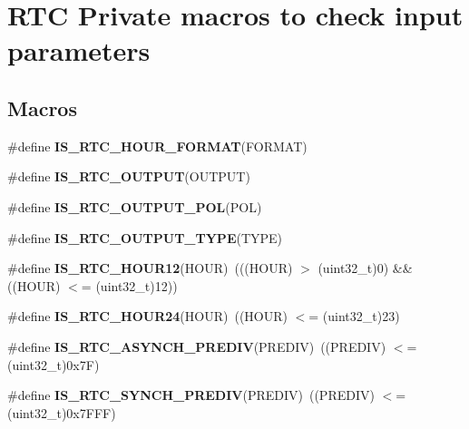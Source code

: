 \hypertarget{group___r_t_c___i_s___r_t_c___definitions}{}\section{R\+TC Private macros to check input parameters}
\label{group___r_t_c___i_s___r_t_c___definitions}
\subsection*{Macros}
\begin{DoxyCompactItemize}
\item 
\#define {\bfseries I\+S\+\_\+\+R\+T\+C\+\_\+\+H\+O\+U\+R\+\_\+\+F\+O\+R\+M\+AT}(F\+O\+R\+M\+AT)
\item 
\#define {\bfseries I\+S\+\_\+\+R\+T\+C\+\_\+\+O\+U\+T\+P\+UT}(O\+U\+T\+P\+UT)
\item 
\#define {\bfseries I\+S\+\_\+\+R\+T\+C\+\_\+\+O\+U\+T\+P\+U\+T\+\_\+\+P\+OL}(P\+OL)
\item 
\#define {\bfseries I\+S\+\_\+\+R\+T\+C\+\_\+\+O\+U\+T\+P\+U\+T\+\_\+\+T\+Y\+PE}(T\+Y\+PE)
\item 
\#define {\bfseries I\+S\+\_\+\+R\+T\+C\+\_\+\+H\+O\+U\+R12}(H\+O\+UR)~(((H\+O\+UR) $>$ (uint32\+\_\+t)0) \&\& ((H\+O\+UR) $<$= (uint32\+\_\+t)12))\hypertarget{group___r_t_c___i_s___r_t_c___definitions_ga6bdfe3bed0a57dfafc2d1de785d48a62}{}\label{group___r_t_c___i_s___r_t_c___definitions_ga6bdfe3bed0a57dfafc2d1de785d48a62}

\item 
\#define {\bfseries I\+S\+\_\+\+R\+T\+C\+\_\+\+H\+O\+U\+R24}(H\+O\+UR)~((H\+O\+UR) $<$= (uint32\+\_\+t)23)\hypertarget{group___r_t_c___i_s___r_t_c___definitions_ga4883613bec76074ac62608b89e3f48a8}{}\label{group___r_t_c___i_s___r_t_c___definitions_ga4883613bec76074ac62608b89e3f48a8}

\item 
\#define {\bfseries I\+S\+\_\+\+R\+T\+C\+\_\+\+A\+S\+Y\+N\+C\+H\+\_\+\+P\+R\+E\+D\+IV}(P\+R\+E\+D\+IV)~((P\+R\+E\+D\+IV) $<$= (uint32\+\_\+t)0x7\+F)\hypertarget{group___r_t_c___i_s___r_t_c___definitions_gac20f6c94ede2d474df8ba4acb7328d93}{}\label{group___r_t_c___i_s___r_t_c___definitions_gac20f6c94ede2d474df8ba4acb7328d93}

\item 
\#define {\bfseries I\+S\+\_\+\+R\+T\+C\+\_\+\+S\+Y\+N\+C\+H\+\_\+\+P\+R\+E\+D\+IV}(P\+R\+E\+D\+IV)~((P\+R\+E\+D\+IV) $<$= (uint32\+\_\+t)0x7\+F\+F\+F)\hypertarget{group___r_t_c___i_s___r_t_c___definitions_ga32fccaa6ec65f9fceb3e6e4f31ab11cf}{}\label{group___r_t_c___i_s___r_t_c___definitions_ga32fccaa6ec65f9fceb3e6e4f31ab11cf}


\end{DoxyCompactItemize}
